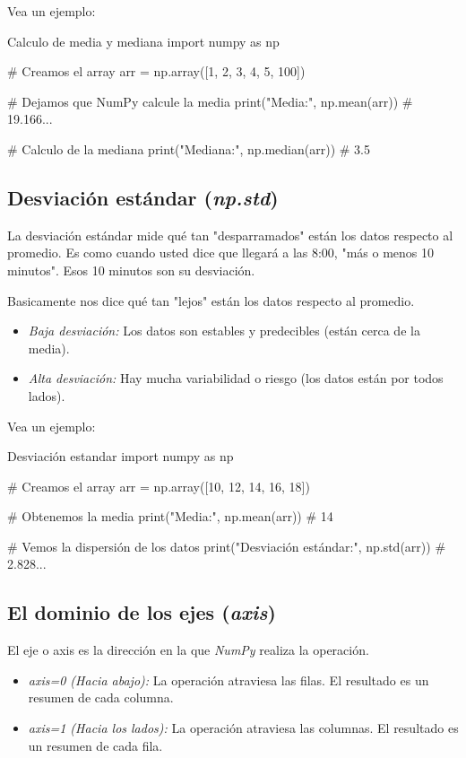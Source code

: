 Vea un ejemplo:
\begin{pycode}{Calculo de media y mediana}
import numpy as np

# Creamos el array
arr = np.array([1, 2, 3, 4, 5, 100])

# Dejamos que NumPy calcule la media
print("Media:", np.mean(arr)) # 19.166...

# Calculo de la mediana
print("Mediana:", np.median(arr)) # 3.5
\end{pycode}

\subsection{Desviación estándar (\textit{np.std})}

La desviación estándar mide qué tan "desparramados" están los datos respecto al promedio. Es como cuando usted dice que llegará a las 8:00, "más o menos 10 minutos". Esos 10 minutos son su desviación.

Basicamente nos dice qué tan "lejos" están los datos respecto al promedio.
\begin{itemize}
\item \textit{Baja desviación:} Los datos son estables y predecibles (están cerca de la media).
\item \textit{Alta desviación:} Hay mucha variabilidad o riesgo (los datos están por todos lados).
\end{itemize}

Vea un ejemplo:
\begin{pycode}{Desviación estandar}
import numpy as np

# Creamos el array
arr = np.array([10, 12, 14, 16, 18])

# Obtenemos la media 
print("Media:", np.mean(arr)) # 14

# Vemos la dispersión de los datos
print("Desviación estándar:", np.std(arr)) # 2.828...
\end{pycode}



\subsection{El dominio de los ejes (\textit{axis})}

El eje o axis es la dirección en la que \textit{NumPy} realiza la operación.

\begin{itemize}
\item \textit{axis=0 (Hacia abajo):} La operación atraviesa las filas. El resultado es un resumen de cada columna.
\item \textit{axis=1 (Hacia los lados):} La operación atraviesa las columnas. El resultado es un resumen de cada fila.
\end{itemize}

